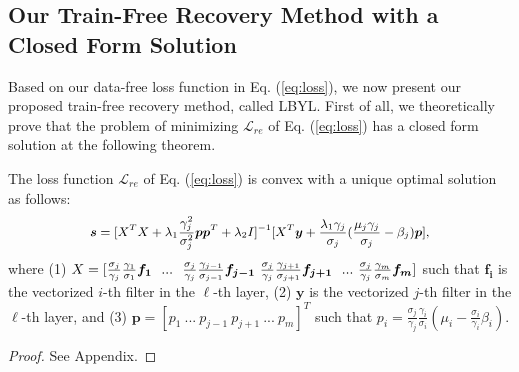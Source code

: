 \subsection{Our Train-Free Recovery Method with a Closed Form Solution}
Based on our data-free loss function in Eq. (\ref{eq:loss}), we now present our proposed train-free recovery method, called LBYL. First of all, we theoretically prove that the problem of minimizing $\mathcal{L}_{re}$ of Eq. (\ref{eq:loss}) has a closed form solution at the following theorem.
\begin{theorem} \label{thm:closedform}
The loss function $\mathcal{L}_{re}$ of Eq. (\ref{eq:loss}) is convex with a unique optimal solution as follows:
\begin{equation}
\small
    \boldsymbol{s}=[X^{T}X+\lambda_{1}\frac{\gamma_{j}^2}{\sigma_{j}^2} \boldsymbol{p}\boldsymbol{p}^{T}+\lambda_{2}I]^{-1}[X^{T}\boldsymbol{y}+\frac{\lambda_{1}\gamma_{j}}{\sigma_{j}}(\frac{\mu_{j}\gamma_{j}}{\sigma_{j}}-\beta_{j})\boldsymbol{p}],
    \nonumber
\end{equation}
where (1) $X = [\frac{\sigma_{j}}{\gamma_{j}}\frac{\gamma_{1}}{\sigma_{1}}\boldsymbol{f_{1}}~~...~~\frac{\sigma_{j}}{\gamma_{j}}\frac{\gamma_{j-1}}{\sigma_{j-1}}\boldsymbol{f_{j-1}}~\frac{\sigma_{j}}{\gamma_{j}}\frac{\gamma_{j+1}}{\sigma_{j+1}}\boldsymbol{f_{j+1}}~~...~~ \\
\frac{\sigma_{j}}{\gamma_{j}}\frac{\gamma_{m}}{\sigma_{m}}\boldsymbol{f_{m}}]$ such that $\boldsymbol{f_{i}}$ is the vectorized $i$-th filter in the $\ell$-th layer, (2) $\boldsymbol{y}$ is the vectorized $j$-th filter in the $\ell$-th layer, and (3) $\boldsymbol{p} =  [p_{1}~...~p_{j-1}~p_{j+1}~...~p_{m}]^T$ such that $p_{i} ={\frac{\sigma_{j}}{\gamma_{j}}\frac{\gamma_{i}}{\sigma_{i}}}{(\mu_{i}-\frac{\sigma_{i}}{\gamma_{i}}\beta_{i})}$.
\end{theorem}
\begin{proof}
See Appendix.
\end{proof}

